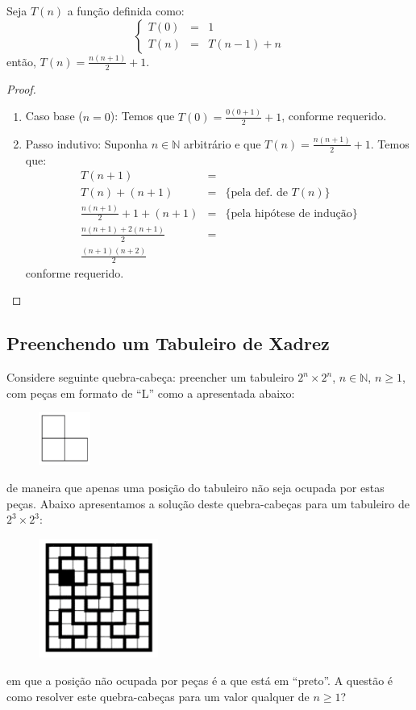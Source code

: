 \begin{Theorem}
Seja $T(n)$ a função definida como:
\[
\left\{
\begin{array}{lcl}
  T(0) & = & 1 \\
  T(n) & = & T(n - 1) + n
\end{array}
\right.
\]
então, $T(n) = \frac{n(n+1)}{2} + 1$.
\end{Theorem}
\begin{proof}
\verb| |\\
\begin{enumerate}
  \item[\ ]Caso base ($n = 0$): Temos que $T(0) = \frac{0(0 + 1)}{2} +
    1$, conforme requerido.
  \item[\ ]Passo indutivo: Suponha $n\in\mathbb{N}$ arbitrário e que
    $T(n) = \frac{n(n+1)}{2} + 1$. Temos que:
   \[
\begin{array}{lcl}
T(n + 1) & = \\
T(n) + (n + 1) & = & \{\text{pela def. de }T(n)\}\\
\frac{n(n+1)}{2} + 1 + (n + 1) & = & \{\text{pela hipótese de
  indução}\}\\
\frac{n(n + 1) + 2(n+1)}{2} & = & \\
\frac{(n + 1)(n + 2)}{2}
\end{array}
   \]
conforme requerido.
\end{enumerate}
\end{proof}

\subsection{Preenchendo um Tabuleiro de Xadrez}

Considere seguinte quebra-cabeça: preencher um tabuleiro $2^n \times 2^n$, $n
\in \mathbb{N}$, $n\geq 1$, com peças em formato de ``L'' como a
apresentada abaixo:
\begin{figure}[H]
  \centering
      \includegraphics[width=0.15\textwidth]{imagens/tromino.png}
 \end{figure}
de maneira que apenas uma posição do tabuleiro não seja ocupada por
estas peças. Abaixo apresentamos a solução deste quebra-cabeças para
um tabuleiro de $2^3\times 2^3$:
\begin{figure}[H]
  \centering
      \includegraphics[width=0.35\textwidth]{imagens/tab5.png}
 \end{figure}
em que a posição não ocupada por peças é a que está em ``preto''. A
questão é como resolver este quebra-cabeças para um valor qualquer de
$n \geq 1$?

